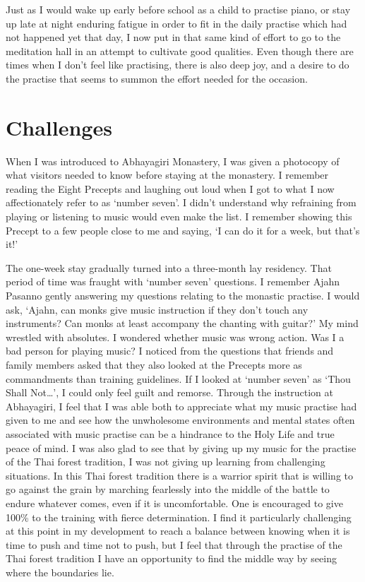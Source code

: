 Just as I would wake up early before school as a
child to practise piano, or stay up late at night enduring fatigue in
order to fit in the daily practise which had not happened yet that day, 
I now put in that same kind of effort to go to the meditation hall in an
attempt to cultivate good qualities. Even though there are times when I
don't feel like practising, there is also deep joy, and a desire to do
the practise that seems to summon the effort needed for the occasion. 

\section{Challenges}

When I was introduced to Abhayagiri Monastery, I was given a photocopy
of what visitors needed to know before staying at the monastery. I
remember reading the Eight Precepts and laughing out loud when I got to
what I now affectionately refer to as `number seven'. I didn't
understand why refraining from playing or listening to music would even
make the list. I remember showing this Precept to a few people close to
me and saying, `I can do it for a week, but that's it!'

The one-week stay gradually turned into a three-month lay residency. 
That period of time was fraught with `number seven' questions. I
remember Ajahn Pasanno gently answering my questions relating to the
monastic practise. I would ask, `Ajahn, can monks give music instruction
if they don't touch any instruments? Can monks at least accompany the
chanting with guitar?' My mind wrestled with absolutes. I wondered
whether music was wrong action. Was I a bad person for playing music? I
noticed from the questions that friends and family members asked that
they also looked at the Precepts more as commandments than training
guidelines. If I looked at `number seven' as `Thou Shall Not\ldots{}', I
could only feel guilt and remorse. Through the instruction at
Abhayagiri, I feel that I was able both to appreciate what my music
practise had given to me and see how the unwholesome environments and
mental states often associated with music practise can be a hindrance to
the Holy Life and true peace of mind. I was also glad to see that by
giving up my music for the practise of the Thai forest tradition, I was
not giving up learning from challenging situations. In this Thai forest
tradition there is a warrior spirit that is willing to go against the
grain by marching fearlessly into the middle of the battle to endure
whatever comes, even if it is uncomfortable. One is encouraged to give
100\% to the training with fierce determination. I find it particularly
challenging at this point in my development to reach a balance between
knowing when it is time to push and time not to push, but I feel that
through the practise of the Thai forest tradition I have an opportunity
to find the middle way by seeing where the boundaries lie. 

